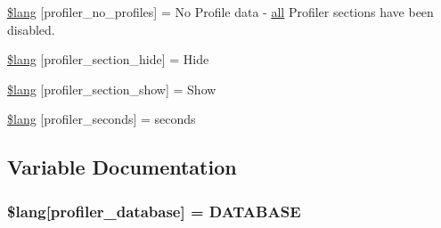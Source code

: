\begin{DoxyCompactItemize}
\item 
\hyperlink{_admin_2system_2language_2english_2profiler__lang_8php_aabea841eed12fa8271f13656fa7d5457}{\$lang} \mbox{[}\textquotesingle{}profiler\+\_\+no\+\_\+profiles\textquotesingle{}\mbox{]} = \textquotesingle{}No Profile data -\/ \hyperlink{change_team_8php_a5f3fcf87333f5770d16608f67ad88d19}{all} Profiler sections have been disabled.\textquotesingle{}
\item 
\hyperlink{_admin_2system_2language_2english_2profiler__lang_8php_a137158ebe1d58bd53bbbb4594f2bc0ed}{\$lang} \mbox{[}\textquotesingle{}profiler\+\_\+section\+\_\+hide\textquotesingle{}\mbox{]} = \textquotesingle{}Hide\textquotesingle{}
\item 
\hyperlink{_admin_2system_2language_2english_2profiler__lang_8php_a3e3b1984f57780efbdaf6d01dac31f3c}{\$lang} \mbox{[}\textquotesingle{}profiler\+\_\+section\+\_\+show\textquotesingle{}\mbox{]} = \textquotesingle{}Show\textquotesingle{}
\item 
\hyperlink{_admin_2system_2language_2english_2profiler__lang_8php_a6d6060d6ca0da3c1e6d4168914d7e362}{\$lang} \mbox{[}\textquotesingle{}profiler\+\_\+seconds\textquotesingle{}\mbox{]} = \textquotesingle{}seconds\textquotesingle{}
\end{DoxyCompactItemize}


\subsection{Variable Documentation}
\hypertarget{_admin_2system_2language_2english_2profiler__lang_8php_a93beea1bc75788ad2b7d3d3895984282}{}
\subsubsection[{\$lang}]{\setlength{\rightskip}{0pt plus 5cm}\$lang\mbox{[}\textquotesingle{}profiler\+\_\+database\textquotesingle{}\mbox{]} = \textquotesingle{}D\+A\+T\+A\+B\+A\+S\+E\textquotesingle{}}\label{_admin_2system_2language_2english_2profiler__lang_8php_a93beea1bc75788ad2b7d3d3895984282}
\hypertarget{_admin_2system_2language_2english_2profiler__lang_8php_a13e794a194b3fae4ac89472fa90a39a4}{}
